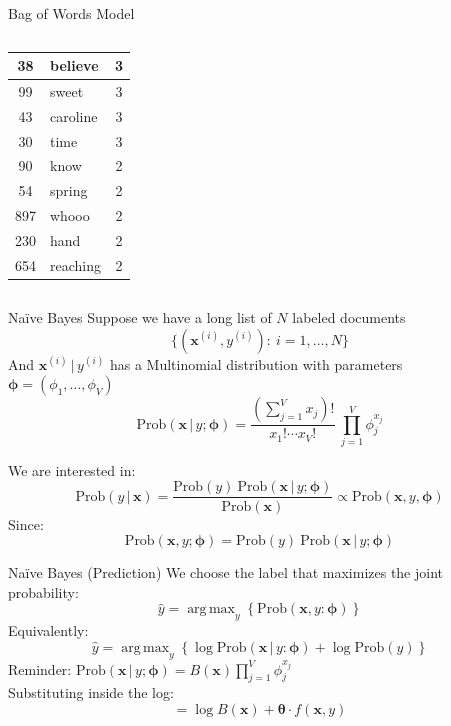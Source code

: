 \documentclass{beamer}
\newcommand{\Prob}{\text{Prob}}
\newcommand{\bx}{\mathbf{x}}
\newcommand{\bphi}{\pmb{\phi}}
\newcommand{\btheta}{\pmb{\theta}}
\newcommand{\given}{\, | \,}
\DeclareMathOperator*{\argmax}{arg\,max}
\begin{document}
\begin{frame}{Bag of Words Model}
\begin{columns}[T]
\begin{column}{0.4\textwidth}
\begin{tabular}{|c|l|c|}
                \hline
                38 & believe&3\\
                \hline
                99 & sweet&3\\
                \hline
                43 & caroline&3\\
                \hline
                30 & time&3\\
                \hline
                90 &know&2\\
                \hline
                54& spring&2\\
                \hline
                897& whooo&2\\
                \hline
                230 & hand&2\\
                \hline
                654 & reaching&2\\
                \hline
            \end{tabular}
        \end{column}
    \end{columns}
\end{frame}

\begin{frame}{Na\"ive Bayes}
    Suppose we have a long list of $N$ labeled documents $$\{(\bx^{(i)},y^{(i)}) :\ i = 1,\ldots, N \}$$
        And $\bx^{(i)}\given y^{(i)} $ has a Multinomial distribution with parameters $\bphi = (\phi_1,\ldots, \phi_V)$ 
        $$\Prob(\bx\given y;\bphi) = \frac{(\sum_{j=1}^V x_j)!}{x_1!\cdots x_V!}\  \prod_{j=1}^V \phi_j^{x_j}$$

        We are interested in:
        $$\Prob(y\given \bx) = \frac{\Prob(y)\  \Prob(\bx \given y; \bphi)}{\Prob(\bx)}\propto \Prob(\bx, y,\bphi)$$
        Since:
        $$\Prob(\bx,y; \bphi) = \Prob(y) \ \Prob(\bx \given y; \bphi)$$

\end{frame}


\begin{frame}{Na\"ive Bayes (Prediction)}
     We choose the label that maximizes the joint probability:
     $$\hat y = \argmax_y\left\{ \Prob(\bx, y: \bphi)\right \}$$
     Equivalently:
     $$\hat y = \argmax_y\left\{ \log \Prob(\bx\given y: \bphi) + \log\Prob(y)\right\}$$
     {\color{green}Reminder:} $\displaystyle \Prob(\bx\given y;\bphi) = B(\bx) \prod_{j=1}^V \phi_j^{x_j}$\\
     Substituting inside the log:
     $$= \log B(\bx) + \btheta\cdot f(\bx, y)$$
     
\end{frame}
\end{document}
